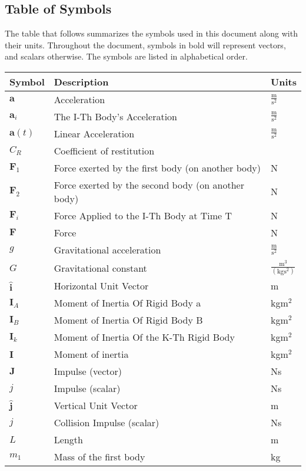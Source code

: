 \documentclass[12pt]{article}
\begin{document}
\subsection{Table of Symbols}
\label{Sec:ToS}
The table that follows summarizes the symbols used in this document along with their units. Throughout the document, symbols in bold will represent vectors, and scalars otherwise. The symbols are listed in alphabetical order.
\begin{longtabu}{l X[l] l}
\toprule
Symbol & Description & Units
\\
\midrule
$\mathbf{a}$ & Acceleration & $\frac{\text{m}}{\text{s}^{2}}$
\\
${\mathbf{a}_{i}}$ & The I-Th Body's Acceleration & $\frac{\text{m}}{\text{s}^{2}}$
\\
$\mathbf{a}(t)$ & Linear Acceleration & $\frac{\text{m}}{\text{s}^{2}}$
\\
${C_{R}}$ & Coefficient of restitution & 
\\
${\mathbf{F}_{1}}$ & Force exerted by the first body (on another body) & N
\\
${\mathbf{F}_{2}}$ & Force exerted by the second body (on another body) & N
\\
${\mathbf{F}_{i}}$ & Force Applied to the I-Th Body at Time T & N
\\
$\mathbf{F}$ & Force & N
\\
$g$ & Gravitational acceleration & $\frac{\text{m}}{\text{s}^{2}}$
\\
$G$ & Gravitational constant & $\frac{\text{m}^{3}}{(\text{kg}\text{s}^{2})}$
\\
$\mathbf{\hat{i}}$ & Horizontal Unit Vector & m
\\
${\mathbf{I}_{A}}$ & Moment of Inertia Of Rigid Body a & kg$\text{m}^{2}$
\\
${\mathbf{I}_{B}}$ & Moment of Inertia Of Rigid Body B & kg$\text{m}^{2}$
\\
${\mathbf{I}_{k}}$ & Moment of Inertia Of the K-Th Rigid Body & kg$\text{m}^{2}$
\\
$\mathbf{I}$ & Moment of inertia & kg$\text{m}^{2}$
\\
$\mathbf{J}$ & Impulse (vector) & Ns
\\
$j$ & Impulse (scalar) & Ns
\\
$\mathbf{\hat{j}}$ & Vertical Unit Vector & m
\\
$j$ & Collision Impulse (scalar) & Ns
\\
$L$ & Length & m
\\
${m_{1}}$ & Mass of the first body & kg

\end{longtabu}
\end{document}
